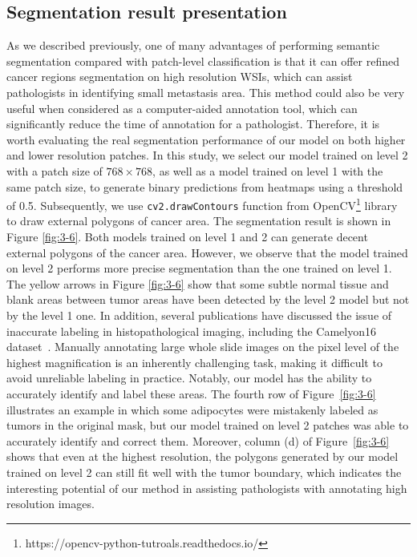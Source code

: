 \subsection{Segmentation result presentation}\label{se:3-4.4}

As we described previously, one of many advantages of performing semantic segmentation compared with patch-level classification is that it can offer refined cancer regions segmentation on high resolution WSIs, which can assist pathologists in identifying small metastasis area. This method could also be very useful when considered as a computer-aided annotation tool, which can significantly reduce the time of annotation for a pathologist. Therefore, it is worth evaluating the real segmentation performance of our model on both higher and lower resolution patches. In this study, we select our model trained on level 2 with a patch size of $768\times768$, as well as a model trained on level 1 with the same patch size, to generate binary predictions from heatmaps using a threshold of 0.5. Subsequently, we use \texttt{cv2.drawContours} function from OpenCV\footnote[3]{https://opencv-python-tutroals.readthedocs.io/} library to draw external polygons of cancer area. The segmentation result is shown in Figure \ref{fig:3-6}. Both models trained on level 1 and 2 can generate decent external polygons of the cancer area. However, we observe that the model trained on level 2 performs more precise segmentation than the one trained on level 1. The yellow arrows in Figure \ref{fig:3-6} show that some  subtle normal tissue and blank areas between tumor areas have been detected by the level 2 model but not by the level 1 one. In addition, several publications have discussed the issue of inaccurate labeling in histopathological imaging, including the Camelyon16 dataset~\cite{cheng2020self,gildenblat2019self,naouar2023robust}. Manually annotating large whole slide images on the pixel level of the highest magnification is an inherently challenging task, making it difficult to avoid unreliable labeling in practice. Notably, our model has the ability to accurately identify and label these areas. The fourth row of Figure~\ref{fig:3-6} illustrates an example in which some adipocytes were mistakenly labeled as tumors in the original mask, but our model trained on level 2 patches was able to accurately identify and correct them. Moreover, column (d) of Figure~\ref{fig:3-6} shows that even at the highest resolution, the polygons generated by our model trained on level 2 can still fit well with the tumor boundary, which indicates the interesting potential of our method in assisting pathologists with annotating high resolution images.


